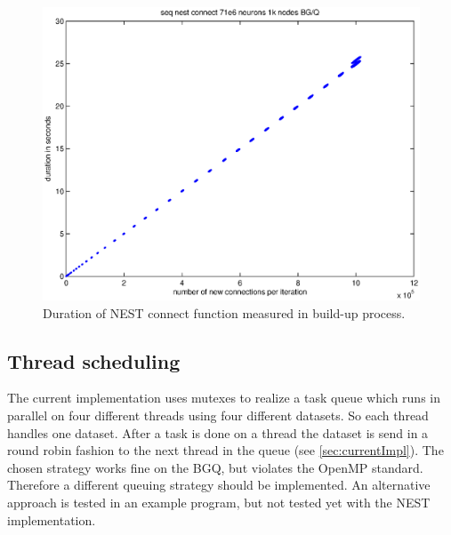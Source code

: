 \documentclass[a4paper]{article}
\begin{document}
\begin{figure}[h]
\centering
\includegraphics[scale=0.5]{seq_nest_conncet_1k.eps}
	\caption{Duration of NEST connect function measured in build-up process.}
	\label{Mikesformatcon}
\end{figure}


\subsection{Thread scheduling}
The current implementation uses mutexes to realize a task queue which runs in parallel on four different threads using four different datasets. So each thread handles one dataset. After a task is done on a thread the dataset is send in a round robin fashion to the next thread in the queue (see \ref{sec:currentImpl}). The chosen strategy works fine on the BGQ, but violates the OpenMP standard.
Therefore a different queuing strategy should be implemented. An alternative approach is tested in an example program,
but not tested yet with the NEST implementation. 

\newpage
\end{document}
